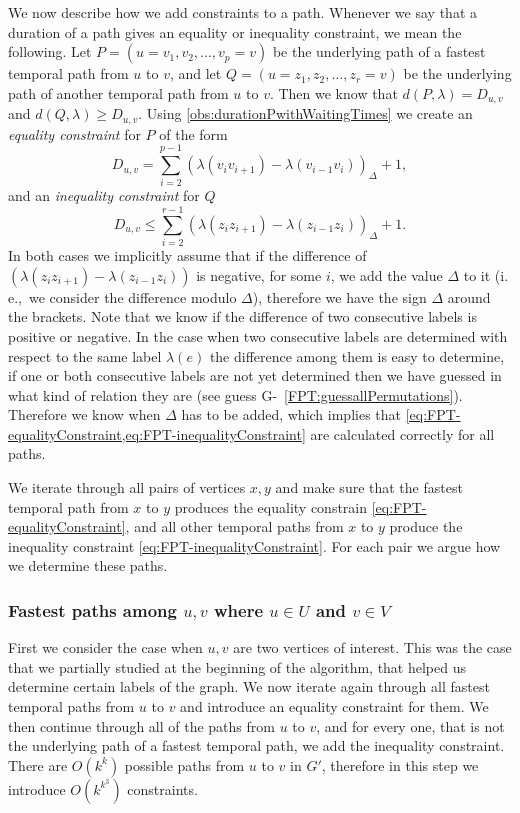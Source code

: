 \documentclass[11pt,a4paper]{article}
\theoremstyle{remark}
\theoremstyle{definition}
\newcommand{\ie}{i.\,e.,\ }
\begin{document}
We now describe how we add constraints to a path. Whenever we say that a duration of a path gives an equality or inequality constraint, we mean the following.
Let $P=(u=v_1,v_2, \dots, v_p = v)$ be the underlying path of a fastest temporal path from $u$ to $v$,
and let $Q = (u=z_1,z_2, \dots, z_r = v)$ be the underlying path of another temporal path from $u$ to $v$.
Then we know that $d(P,\lambda) = D_{u,v}$ and $d(Q, \lambda) \geq D_{u,v}$.
Using \cref{obs:durationPwithWaitingTimes}
we create an \emph{equality constraint} for $P$
of the form 
\begin{equation}\label{eq:FPT-equalityConstraint}
    D_{u,v} = \sum _ {i=2} ^ {p-1} (\lambda (v_{i}v_{i+1}) - \lambda (v_{i-1}v_i))_\Delta + 1,
\end{equation}
and an \emph{inequality constraint} for $Q$ 
\begin{equation}\label{eq:FPT-inequalityConstraint}
    D_{u,v} \leq \sum _ {i=2} ^ {r-1} (\lambda (z_{i}z_{i+1}) - \lambda (z_{i-1}z_i))_\Delta + 1.
\end{equation}
In both cases we implicitly assume that if the difference of $(\lambda (z_{i}z_{i+1}) - \lambda (z_{i-1}z_i))$ is negative, for some $i$, we add the value $\Delta$ to it (\ie we consider the difference modulo $\Delta$), therefore we have the sign $\Delta$ around the brackets.
Note that we know if the difference of two consecutive labels is positive or negative. 
In the case when two consecutive labels are determined with respect to the same label $\lambda(e)$ the difference among them is easy to determine,
if one or both consecutive labels are not yet determined 
then we have guessed in what kind of relation they are (see guess G-~\ref{FPT:guessallPermutations}).
Therefore we know when $\Delta$ has to be added, which implies that \cref{eq:FPT-equalityConstraint,eq:FPT-inequalityConstraint} are calculated correctly for all paths.

We iterate through all pairs of vertices $x,y$ and make sure that the fastest temporal path from $x$ to $y$ produces the equality constrain \cref{eq:FPT-equalityConstraint},
and all other temporal paths from $x$ to $y$ produce the inequality constraint \cref{eq:FPT-inequalityConstraint}.
For each pair we argue how we determine these paths.

\subsubsection*{\boldmath Fastest paths among $u,v$ where $u \in U$ and $v \in V$}
First we consider the case when $u,v$ are two vertices of interest.
This was the case that we partially studied at the beginning of the algorithm, that helped us determine certain labels of the graph.
We now iterate again through all fastest temporal paths from $u$ to $v$ and introduce an equality constraint for them.
We then continue 
through all of the paths from $u$ to $v$, and for every one, that is not the underlying path of a fastest temporal path, we add the inequality constraint.
There are $O(k^k)$ possible paths from $u$ to $v$ in $G'$, therefore in this step we introduce $O(k^{k^3})$ constraints.
\end{document}
